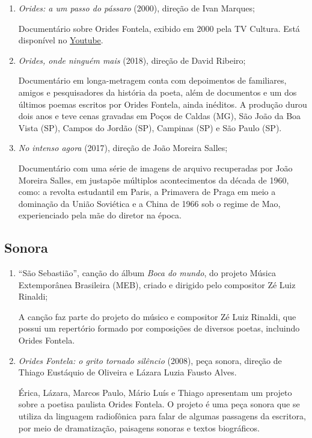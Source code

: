 \documentclass[12pt]{extarticle}
\begin{document}
\begin{enumerate}
\item
  \emph{Orides: a um passo do pássaro} (2000), direção de Ivan Marques;

  Documentário sobre Orides Fontela, exibido em 2000 pela TV Cultura. Está disponível no \href{https://www.youtube.com/watch?v=l9XbX8JTMXI}{Youtube}.

\item
  \emph{Orides, onde ninguém mais} (2018), direção de David Ribeiro;

  Documentário em longa-metragem conta com depoimentos de familiares, amigos e pesquisadores da história da poeta, além de documentos e um dos últimos poemas escritos por Orides Fontela, ainda inéditos. A produção durou dois anos e teve cenas gravadas em Poços de Caldas (MG), São João da Boa Vista (SP), Campos do Jordão (SP), Campinas (SP) e São Paulo (SP).

\item
  \emph{No intenso agora} (2017), direção de João Moreira Salles;

Documentário com uma série de imagens de arquivo recuperadas por João Moreira Salles, em justapõe múltiplos acontecimentos da década de 1960, como: a revolta estudantil em Paris, a Primavera de Praga em meio a dominação da União Soviética e a China de 1966 sob o regime de Mao, experienciado pela mãe do diretor na época. 

\end{enumerate}

\subsection{Sonora}

\begin{enumerate}
\item
  ``São Sebastião'', canção do álbum \emph{Boca do mundo}, do projeto Música
  Extemporânea Brasileira (MEB), criado e dirigido pelo compositor Zé
  Luiz Rinaldi;

 A canção faz parte do projeto do músico e compositor Zé Luiz Rinaldi, que possui um repertório formado por composições de diversos poetas, incluindo Orides Fontela.


\item
  \emph{Orides Fontela: o grito tornado silêncio} (2008), peça sonora,
  direção de Thiago Eustáquio de Oliveira e Lázara Luzia Fausto Alves.

Érica, Lázara, Marcos Paulo, Mário Luís e Thiago apresentam um projeto sobre a poetisa paulista Orides Fontela. O projeto é uma peça sonora que se utiliza da linguagem radiofônica para falar de algumas passagens da escritora, por meio de dramatização, paisagens sonoras e textos biográficos.

\end{enumerate}
\end{document}
